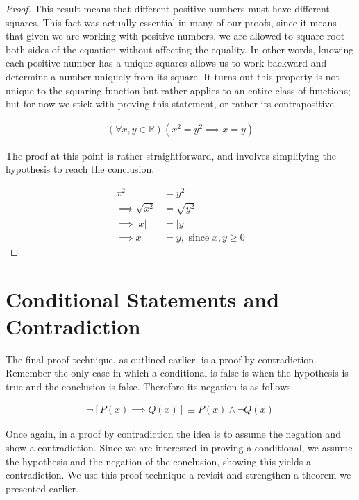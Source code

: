 \documentclass[twoside]{report}
\begin{document}
\begin{proof}
	This result means that different positive numbers must have different squares. This fact was actually essential in many of our proofs, since it means that given we are working with positive numbers, we are allowed to square root both sides of the equation without affecting the equality. In other words, knowing each positive number has a unique squares allows us to work backward and determine a number uniquely from its square. It turns out this property is not unique to the squaring function but rather applies to an entire class of functions; but for now we stick with proving this statement, or rather its contrapositive.
	
	\begin{align*}
		(\forall x, y \in \mathbb{R})(x^2 = y^2 \implies x = y)
	\end{align*}
	
	The proof at this point is rather straightforward, and involves simplifying the hypothesis to reach the conclusion.
	
	\begin{align*}
		x^2 &= y^2 \\
		\implies \sqrt{x^2} &= \sqrt{y^2} \\
		\implies |x| &= |y| \\
		\implies x &= y, \text{ since $x, y \ge 0$}
	\end{align*}
\end{proof}
\vspace{\baselineskip}

\section{Conditional Statements and Contradiction}

The final proof technique, as outlined earlier, is a proof by contradiction. Remember the only case in which a conditional is false is when the hypothesis is true and the conclusion is false. Therefore its negation is as follows.

\begin{align*}
	\neg[P(x) \implies Q(x)] \equiv P(x) \wedge \neg Q(x)
\end{align*}

Once again, in a proof by contradiction the idea is to assume the negation and show a contradiction. Since we are interested in proving a conditional, we assume the hypothesis and the negation of the conclusion, showing this yields a contradiction. We use this proof technique a revisit and strengthen a theorem we presented earlier.
\end{document}
